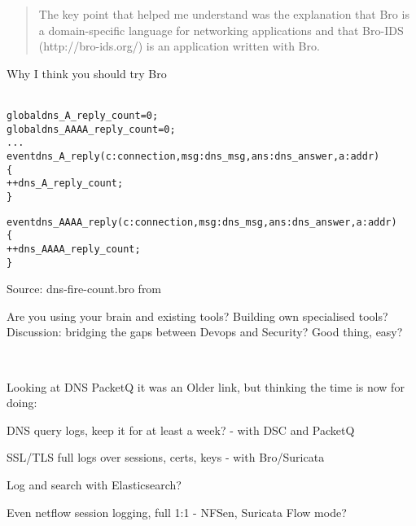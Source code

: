 \documentclass[20pt,landscape,a4paper,footrule]{foils}
\begin{document}

\begin{quote}
	The key point that helped me understand was the explanation that Bro is a
               domain-specific language for networking applications and that Bro-IDS
               (http://bro-ids.org/) is an application written with Bro.
\end{quote}

Why I think you should try Bro\\
\\


\begin{alltt}\small
global dns_A_reply_count=0;
global dns_AAAA_reply_count=0;
...
event dns_A_reply(c: connection, msg: dns_msg, ans: dns_answer, a: addr)
	\{
	++dns_A_reply_count;
	\}

event dns_AAAA_reply(c: connection, msg: dns_msg, ans: dns_answer, a: addr)
	\{
	++dns_AAAA_reply_count;
	\}
\end{alltt}

Source: dns-fire-count.bro from\\
{\small {}}



Are you using your brain and existing tools? Building own specialised tools?\\
Discussion: bridging the gaps between Devops and Security? Good thing, easy?

{\footnotesize
{}\\
}



Looking at DNS PacketQ it was an Older link, but thinking the time is now for doing:

\begin{list2}
\item DNS query logs, keep it for at least a week? - with DSC and PacketQ
\item SSL/TLS full logs over sessions, certs, keys - with Bro/Suricata\\
\item Log and search with Elasticsearch?\\
\item Even netflow session logging, full 1:1 - NFSen, Suricata Flow mode?
\end{list2}
\end{document}
